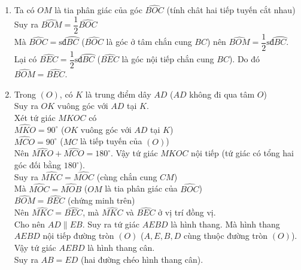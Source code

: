 \begin{ex}
{\begin{enumerate}
{}
\item Ta có $OM$ là tia phân giác của góc $\widehat{BOC}$ (tính chât hai tiếp tuyến cắt nhau)\\
Suy ra $\widehat{BOM}=\dfrac{1}{2}\widehat{BOC}$ \\
Mà $\widehat{BOC}=\text{sđ}\wideparen{BC}$ ($\widehat{BOC}$ là góc ở tâm chắn cung $BC$) nên $\widehat{BOM}=\dfrac{1}{2}\text{sđ}\wideparen{BC}$.\\
Lại có $\widehat{BEC}=\dfrac{1}{2}\text{sđ}\wideparen{BC}$ ($\widehat{BEC}$ là góc nội tiếp chắn cung $BC$). Do đó $\widehat{BOM}=\widehat{BEC}$.
\item Trong $(O)$, có $K$ là trung điểm dây $AD$ ($AD$ không đi qua tâm $O$)\\
Suy ra $OK$ vuông góc với $AD$ tại $K$.\\
Xét tứ giác $MKOC$ có\\ $\widehat{MKO}=90^\circ$ ($OK$ vuông góc với $AD$ tại $K$)\\
$\widehat{MCO}=90^\circ$ ($MC$ là tiếp tuyến của $(O)$)\\
Nên $\widehat{MKO}+\widehat{MCO}=180^\circ$. Vậy tứ giác $MKOC$ nội tiếp (tứ giác có tổng hai góc đối bằng $180^\circ$).\\
Suy ra $\widehat{MKC}=\widehat{MOC}$ (cùng chắn cung $CM$)\\
Mà $\widehat{MOC}=\widehat{MOB}$ ($OM$ là tia phân giác của $\widehat{BOC}$)\\
$\widehat{BOM}=\widehat{BEC}$ (chứng minh trên)\\
Nên $\widehat{MKC}=\widehat{BEC}$, mà $\widehat{MKC}$ và $\widehat{BEC}$ ở vị trí đồng vị.\\
Cho nên $AD\parallel EB$. Suy ra tứ giác $AEBD$ là hình thang. Mà hình thang $AEBD$ nội tiếp đường tròn $(O)$ ($A,E,B,D$ cùng thuộc đường tròn $(O)$).\\
Vậy tứ giác $AEBD$ là hình thang cân.\\
Suy ra $AB=ED$ (hai đường chéo hình thang cân).
	\end{enumerate}}
	
\end{ex}
